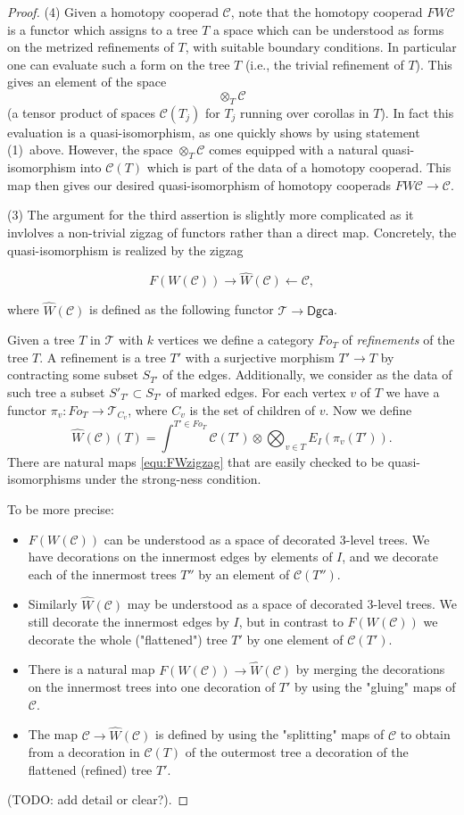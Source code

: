 \documentclass[a4paper]{amsart}
\theoremstyle{plain}
\theoremstyle{definition}
\newcommand{\op}{\mathcal}
\newcommand{\dgca}{\mathsf{Dgca}}
\newcommand{\mT}{{\mathcal{T}}}
\newcommand{\beq}[1]{
\begin{equation}\label{#1}
}
\newcommand{\eeq}{
\end{equation}
}
\begin{document}
\begin{proof}
(4) Given a homotopy cooperad $\op C$, note that the homotopy cooperad $F W\op C$ is a functor which assigns to a tree $T$ a space which can be understood as forms on the metrized refinements of $T$, with suitable boundary conditions.
In particular one can evaluate such a form on the tree $T$ (i.e., the trivial refinement of $T$). This gives an element of the space
\[
 \otimes_T \op C
\]
(a tensor product of spaces $\op C(T_j)$ for $T_j$ running over corollas in $T$).
In fact this evaluation is a quasi-isomorphism, as one quickly shows by using statement (1) above.
However, the space $\otimes_T \op C$ comes equipped with a natural quasi-isomorphism into $\op C(T)$ which is part of the data of a homotopy cooperad.
This map then gives our desired quasi-isomorphism of homotopy cooperads $F W\op C \to \op C$.

(3) The argument for the third assertion is slightly more complicated as it invlolves a non-trivial zigzag of functors rather than a direct map.
Concretely, the quasi-isomorphism is realized by the zigzag
\beq{equ:FWzigzag}
F(W(\op C)) \to \hat W(\op C) \leftarrow \op C,
\eeq
where $\hat W(\op C)$ is defined as the following functor $\mT\to \dgca$.

Given a tree $T$ in $\mT$ with $k$ vertices we define a category $Fo_T$ of \emph{refinements} of the tree $T$.
A refinement is a tree $T'$ with a surjective morphism $T'\to T$ by contracting some subset $S_{T'}$ of the edges.
Additionally, we consider as the data of such tree a subset $S'_{T'}\subset S_{T'}$ of marked edges.
For each vertex $v$ of $T$ we have a functor $\pi_v:Fo_T\to \mT_{C_v}$, where $C_v$ is the set of children of $v$.
Now we define
\[
\hat W(\op C)(T) = \int^{T'\in Fo_T} \op C(T') \otimes \bigotimes_{v\in T} E_I(\pi_v(T')).
\]
There are natural maps \eqref{equ:FWzigzag} that are easily checked to be quasi-isomorphisms under the strong-ness condition.

To be more precise:
\begin{itemize}
\item $F(W(\op C))$ can be understood as a space of decorated 3-level trees. We have decorations on the innermost edges by elements of $I$, and we decorate each of the innermost trees $T''$ by an element of $\op C(T'')$.
\item Similarly $\hat W(\op C)$ may be understood as a space of decorated 3-level trees. We still decorate the innermost edges by $I$, but in contrast to $F(W(\op C))$ we decorate the whole ("flattened") tree $T'$ by one element of $\op C(T')$. 
\item There is a natural map $F(W(\op C))\to \hat W(\op C)$ by merging the decorations on the innermost trees into one decoration of $T'$ by using the "gluing" maps of $\op C$.
\item The map $\op C\to \hat W(\op C)$ is defined by using the "splitting" maps of $\op C$ to obtain from a decoration in $\op C(T)$ of the outermost tree a decoration of the flattened (refined) tree $T'$.
\end{itemize}
(TODO: add detail or clear?).

\end{proof}
\end{document}
